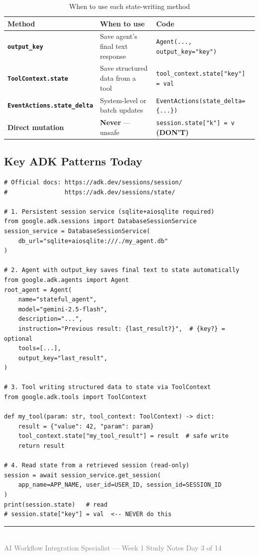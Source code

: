 \documentclass[12pt, a4paper]{article}
\begin{document}
\begin{table}[h!]
\centering
\small
\begin{tabular}{>{\bfseries}p{3.5cm} p{4cm} p{4cm}}
\toprule
\textbf{Method} & \textbf{When to use} & \textbf{Code} \\
\midrule
\texttt{output\_key} & Save agent's final text response & \texttt{Agent(..., output\_key="key")} \\
\addlinespace
\texttt{ToolContext.state} & Save structured data from a tool & \texttt{tool\_context.state["key"] = val} \\
\addlinespace
\texttt{EventActions.state\_delta} & System-level or batch updates & \texttt{EventActions(state\_delta=\{...\})} \\
\addlinespace
Direct mutation & \textbf{Never} --- unsafe & \texttt{session.state["k"] = v}  \textbf{(DON'T)} \\
\bottomrule
\end{tabular}
\caption{When to use each state-writing method}
\end{table}

\subsection*{Key ADK Patterns Today}

\begin{lstlisting}[style=pythonstyle]
# Official docs: https://adk.dev/sessions/session/
#                https://adk.dev/sessions/state/

# 1. Persistent session service (sqlite+aiosqlite required)
from google.adk.sessions import DatabaseSessionService
session_service = DatabaseSessionService(
    db_url="sqlite+aiosqlite:///./my_agent.db"
)

# 2. Agent with output_key saves final text to state automatically
from google.adk.agents import Agent
root_agent = Agent(
    name="stateful_agent",
    model="gemini-2.5-flash",
    description="...",
    instruction="Previous result: {last_result?}",  # {key?} = optional
    tools=[...],
    output_key="last_result",
)

# 3. Tool writing structured data to state via ToolContext
from google.adk.tools import ToolContext

def my_tool(param: str, tool_context: ToolContext) -> dict:
    result = {"value": 42, "param": param}
    tool_context.state["my_tool_result"] = result  # safe write
    return result

# 4. Read state from a retrieved session (read-only)
session = await session_service.get_session(
    app_name=APP_NAME, user_id=USER_ID, session_id=SESSION_ID
)
print(session.state)   # read
# session.state["key"] = val  <-- NEVER do this
\end{lstlisting}

\vfill
\noindent\rule{\textwidth}{0.4pt}\\
{\small\textcolor{gray}{AI Workflow Integration Specialist --- Week 1 Study Notes \hfill Day 3 of 14}}
\end{document}
